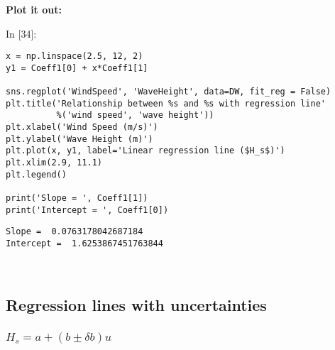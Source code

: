 \documentclass[11pt]{article}
\newif\ifcode
\newif\ifleftmargins
\newlength{\promptlength}
\newcommand{\prompt}[3]{
        \needspace{1.1cm}
        \settowidth{\promptlength}{ #1 [#3] }
        \ifleftmargins\hspace{-\promptlength}\hspace{-5pt}\fi
        {\color{#2}#1 [#3]:}
        \ifleftmargins\vspace{-2.7ex}\fi
    }
\renewcommand{\paragraph}{\textbf}
\begin{document}
    \hypertarget{plot-it-out}{%
\paragraph{Plot it out:}\label{plot-it-out}}

    
\prompt{In}{incolor}{34}
\codetrue
\begin{tcolorbox}[breakable, size=fbox, boxrule=1pt, pad at break*=1mm, colback=cellbackground, colframe=cellborder]
\begin{verbatim}
x = np.linspace(2.5, 12, 2)
y1 = Coeff1[0] + x*Coeff1[1]

sns.regplot('WindSpeed', 'WaveHeight', data=DW, fit_reg = False)
plt.title('Relationship between %s and %s with regression line'
          %('wind speed', 'wave height'))
plt.xlabel('Wind Speed (m/s)')
plt.ylabel('Wave Height (m)')
plt.plot(x, y1, label='Linear regression line ($H_s$)')
plt.xlim(2.9, 11.1)
plt.legend()

print('Slope = ', Coeff1[1])
print('Intercept = ', Coeff1[0])
\end{verbatim}
\end{tcolorbox}
\codefalse

    \begin{Verbatim}[commandchars=\\\{\}]
Slope =  0.0763178042687184
Intercept =  1.6253867451763844

    \end{Verbatim}

    \begin{center}
    \end{center}
    { \hspace*{\fill} \\}
    
    \hypertarget{regression-lines-with-uncertainties}{%
\subsection{Regression lines with
uncertainties}\label{regression-lines-with-uncertainties}}

    \hypertarget{h_s-a-b-pm-delta-bu}{%
\subsubsection{\texorpdfstring{\(H_s = a + (b \pm \delta b)u\)}{H\_s = a + (b \textbackslash{}pm \textbackslash{}delta b)u}}\label{h_s-a-b-pm-delta-bu}}
\end{document}
